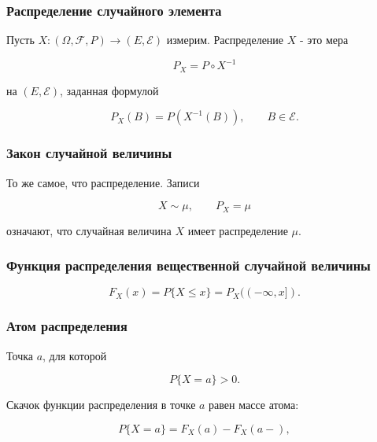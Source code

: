 \documentclass[
  11pt,
  a4paper,
]{article}
\begin{document}
\subsubsection{Распределение случайного
элемента}\label{ux440ux430ux441ux43fux440ux435ux434ux435ux43bux435ux43dux438ux435-ux441ux43bux443ux447ux430ux439ux43dux43eux433ux43e-ux44dux43bux435ux43cux435ux43dux442ux430}

Пусть \(X:(\Omega,\mathcal F,P)\to(E,\mathcal E)\) измерим.
Распределение \(X\) - это мера

\[
P_X=P\circ X^{-1}
\]

на \((E,\mathcal E)\), заданная формулой

\[
P_X(B)=P(X^{-1}(B)),\qquad B\in\mathcal E.
\]

\subsubsection{Закон случайной
величины}\label{ux437ux430ux43aux43eux43d-ux441ux43bux443ux447ux430ux439ux43dux43eux439-ux432ux435ux43bux438ux447ux438ux43dux44b}

То же самое, что распределение. Записи

\[
X\sim\mu,\qquad P_X=\mu
\]

означают, что случайная величина \(X\) имеет распределение \(\mu\).

\subsubsection{Функция распределения вещественной случайной
величины}\label{ux444ux443ux43dux43aux446ux438ux44f-ux440ux430ux441ux43fux440ux435ux434ux435ux43bux435ux43dux438ux44f-ux432ux435ux449ux435ux441ux442ux432ux435ux43dux43dux43eux439-ux441ux43bux443ux447ux430ux439ux43dux43eux439-ux432ux435ux43bux438ux447ux438ux43dux44b-1}

\[
F_X(x)=P\{X\le x\}=P_X((-\infty,x]).
\]

\subsubsection{Атом
распределения}\label{ux430ux442ux43eux43c-ux440ux430ux441ux43fux440ux435ux434ux435ux43bux435ux43dux438ux44f}

Точка \(a\), для которой

\[
P\{X=a\}>0.
\]

Скачок функции распределения в точке \(a\) равен массе атома:

\[
P\{X=a\}=F_X(a)-F_X(a-),
\]
\end{document}
